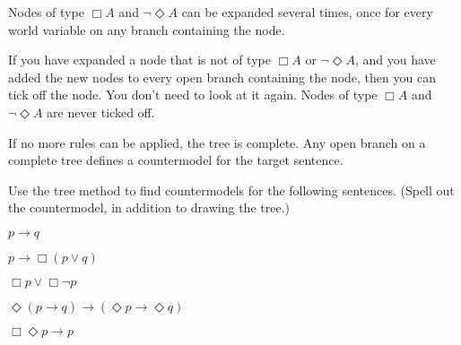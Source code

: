 Nodes of type $\Box A$ and $\neg \Diamond A$ can be expanded several times, once
for every world variable on any branch containing the node.

If you have expanded a node that is not of type $\Box A$ or $\neg \Diamond A$,
and you have added the new nodes to every open branch containing the node, then
you can tick off the node. You don't need to look at it again. Nodes of type
$\Box A$ and $\neg \Diamond A$ are never ticked off.

If no more rules can be applied, the tree is complete. Any open branch on a
complete tree defines a countermodel for the target sentence.
%
\begin{exercise}
  Use the tree method to find countermodels for the following
  sentences. (Spell out the countermodel, in addition to drawing the tree.)
  \begin{exlist}
  \item $p\to q$ 
  \item $p \to \Box(p \lor q)$
  \item $\Box p \lor \Box \neg p$
  \item $\Diamond(p \to q) \to (\Diamond p \to \Diamond q)$
  \item $\Box \Diamond p \to p$ %
  \end{exlist}
\end{exercise}
